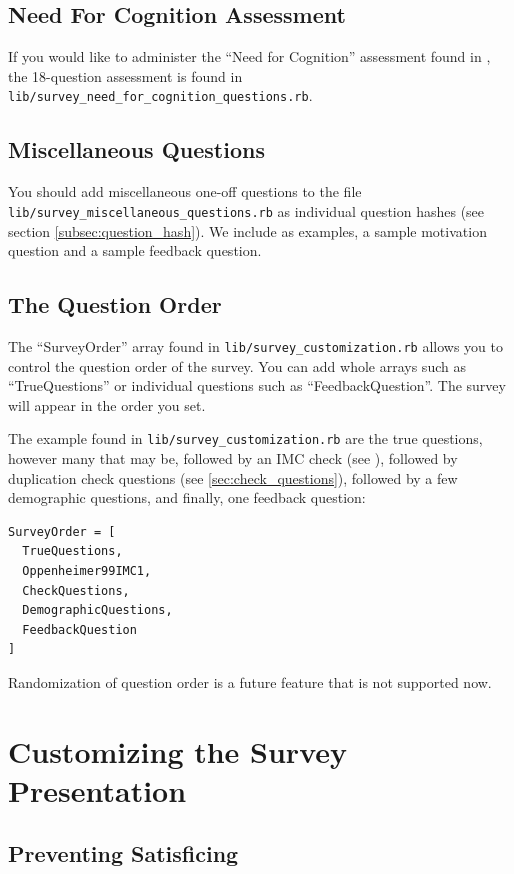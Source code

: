 \documentclass[12pt]{article}
\begin{document}
\subsection{Need For Cognition Assessment}

If you would like to administer the ``Need for Cognition'' assessment found in \citet{Cacioppo1984}, the 18-question assessment is found in {\tt{lib/survey\_need\_for\_cognition\_questions.rb}}.

\subsection{Miscellaneous Questions}

You should add miscellaneous one-off questions to the file {\tt{lib/survey\_miscellaneous\_questions.rb}} as individual question hashes (see section \ref{subsec:question_hash}). We include as examples, a sample motivation question and a sample feedback question.

\subsection{The Question Order}

The ``SurveyOrder'' array found in {\tt{lib/survey\_customization.rb}} allows you to control the question order of the survey. You can add whole arrays such as ``TrueQuestions'' or individual questions such as ``FeedbackQuestion''. The survey will appear in the order you set. 

The example found in {\tt{lib/survey\_customization.rb}} are the true questions, however many that may be, followed by an IMC check (see \citet{Opp09}), followed by duplication check questions (see \ref{sec:check_questions}), followed by a few demographic questions, and finally, one feedback question:

\begin{verbatim}
SurveyOrder = [
  TrueQuestions,
  Oppenheimer99IMC1,
  CheckQuestions,
  DemographicQuestions,
  FeedbackQuestion
]
\end{verbatim}

Randomization of question order is a future feature that is not supported now.

\section{Customizing the Survey Presentation}\label{sec:design_customization}

\subsection{Preventing Satisficing}
\end{document}
